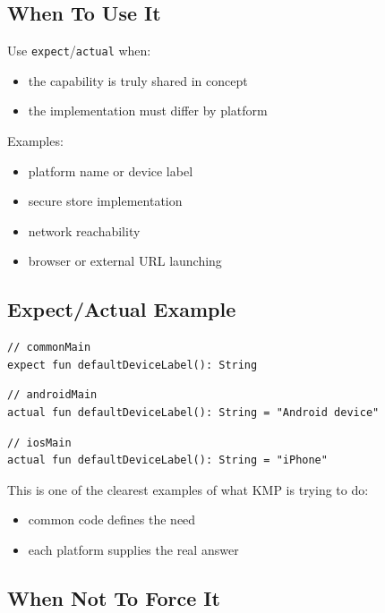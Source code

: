 \documentclass[11pt,a4paper]{article}
\begin{document}
\subsection{When To Use It}

Use \texttt{expect}/\texttt{actual} when:
\begin{itemize}
    \item the capability is truly shared in concept
    \item the implementation must differ by platform
\end{itemize}

Examples:
\begin{itemize}
    \item platform name or device label
    \item secure store implementation
    \item network reachability
    \item browser or external URL launching
\end{itemize}

\subsection{Expect/Actual Example}

\begin{lstlisting}[style=kazekotlin]
// commonMain
expect fun defaultDeviceLabel(): String
\end{lstlisting}

\begin{lstlisting}[style=kazekotlin]
// androidMain
actual fun defaultDeviceLabel(): String = "Android device"
\end{lstlisting}

\begin{lstlisting}[style=kazekotlin]
// iosMain
actual fun defaultDeviceLabel(): String = "iPhone"
\end{lstlisting}

This is one of the clearest examples of what KMP is trying to do:
\begin{itemize}
    \item common code defines the need
    \item each platform supplies the real answer
\end{itemize}

\subsection{When Not To Force It}
\end{document}
